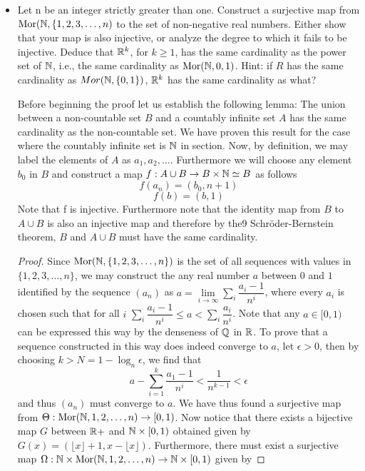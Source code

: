\begin{itemize}
\begin{proof}
\end{proof}
\item Let n be an integer strictly greater than one. Construct a surjective map from $\text{Mor}(\mathbb{N},\{1,2,3,\ldots,n)$ to the set of non-negative real numbers. Either show that your map is also injective, or analyze the degree to
which it fails to be injective. Deduce that $\mathbb{R}^k$, for $k\geq 1$, has the
same cardinality as the power set of $\mathbb{N}$, i.e., the same cardinality as
$\text{Mor}(\mathbb{N},{0,1})$. Hint: if $R$ has the same cardinality as $Mor(\mathbb{N},\{0, 1\})$, $\mathbb{R}^k$ has the same cardinality as what?
\begin{lemma}
Before beginning the proof let us establish the following lemma: The union between a non-countable set $B$  and a countably infinite set $A$ has the same cardinality as the non-countable set. We have proven this result for the case where the countably infinite set is $\mathbb{N}$ in section.  Now, by definition, we may label the elements of $A$ as $a_1,a_2,\ldots$. Furthermore we will choose any element $b_0$ in $B$ and construct a map $f: A\cup B\to B\times\mathbb{N}\simeq B$ as follows
\[ f(a_n)=(b_0,n+1)\]
\[ f(b) = (b,1) \]
Note that f is injective. Furthermore note that the identity map from $B$ to $A\cup B$ is also an injective map and therefore by the9 Schr\"oder-Bernstein theorem, $B$ and $A\cup B$ must have the same cardinality. 

\end{lemma}
\begin{proof}

Since $\text{Mor}(\mathbb{N},\{1,2,3,\ldots,n\})$ is the set of all sequences with values in $\{1,2,3,\ldots,n\}$, we may construct the any real number $a$ between $0$ and $1$ identified by the sequence $(a_n)$ as $a=\lim\limits_{i\to\infty}\sum\limits_i \dfrac{a_i -1}{n^i}$, where every $a_i$ is chosen such that for all $i$ $\sum\limits_i \dfrac{a_i -1}{n^i} \leq a < \sum\limits_i \dfrac{a_i}{n^i}$. Note that any $a\in [0,1)$ can be expressed this way by the denseness of $\mathbb{Q}$ in $\mathbb{R}$. To prove that a sequence constructed in this way does indeed converge to $a$, let $\epsilon>0$, then by choosing $k>N=1-\log_n\epsilon$, we find that
\[ a-\sum\limits_{i=1}^k \frac{a_1-1}{n^i}<\frac{1}{n^{k-1}}<\epsilon\] 
and thus $(a_n)$ must converge to $a$. We have thus found a surjective map from $\Theta: \text{Mor}(\mathbb{N},{1,2,\ldots,n})\to[0,1)$. 
Now notice that there exists a bijective map $G$ between $\mathbb{R}+$ and $\mathbb{N}\times [0,1)$ obtained given by 
$G(x)=(\lfloor x \rfloor+1,x-\lfloor x \rfloor)$. Furthermore, there must exist a surjective map 
$\Omega:\mathbb{N}\times\text{Mor}(\mathbb{N},{1,2,\ldots,n})\to\mathbb{N}\times [0,1)$ given by


\end{proof}
\end{itemize}
